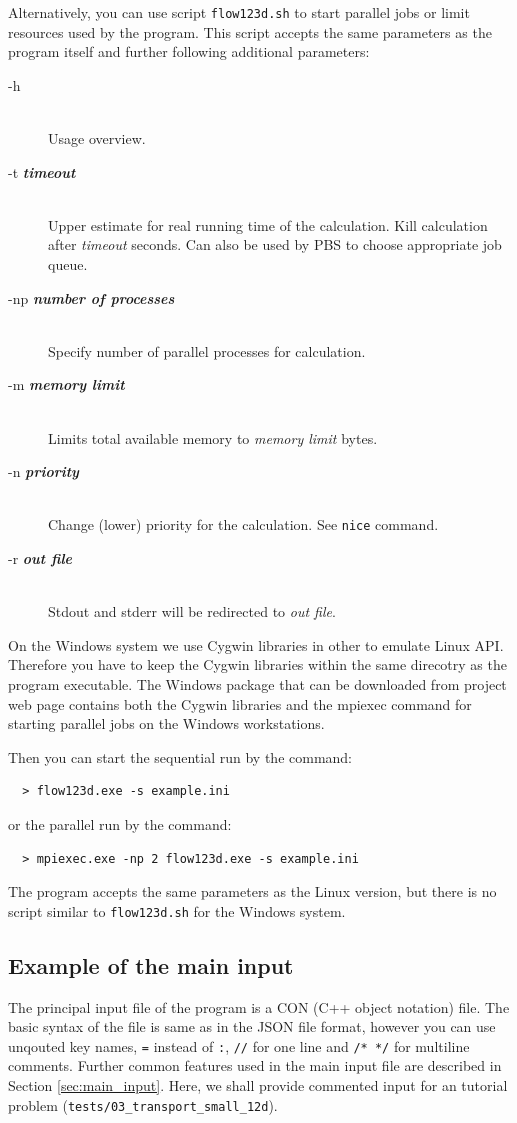 \documentclass[12pt,a4paper]{report}
\begin{document}
Alternatively, you can use script \verb'flow123d.sh' to start parallel jobs or limit resources used by the program. 
This script accepts the same parameters as the program itself
and further following additional parameters:

\begin{description}
  \item[-h] \hfill\\
  	Usage overview.
  \item[-t {\bf\it timeout}] \hfill\\
  	Upper estimate for real running time of the calculation. Kill calculation after {\it timeout} seconds. 
  	Can also be used by PBS to choose appropriate job queue. 
  \item[-np {\bf\it number of processes}] \hfill\\
  	Specify number of parallel processes for calculation.
  \item[-m {\bf\it memory limit}] \hfill\\
  	Limits total available memory to {\it memory limit} bytes.
  \item[-n {\bf\it priority}] \hfill\\
  	Change (lower) priority for the calculation. See {\tt nice} command.
  \item[-r {\bf\it out file}] \hfill\\
  	Stdout and stderr will be redirected to {\it out file}.
\end{description}

On the Windows system we use Cygwin libraries in other to emulate Linux API.
Therefore you have to keep the Cygwin libraries within the same direcotry as the program executable.
The Windows package that can be downloaded from project web page contains both the Cygwin libraries
and the mpiexec command for starting parallel jobs on the Windows workstations.

Then you can start the sequential run by the command:
\begin{verbatim}
  > flow123d.exe -s example.ini
\end{verbatim}
or the parallel run by the command:
\begin{verbatim}
  > mpiexec.exe -np 2 flow123d.exe -s example.ini
\end{verbatim}
The program accepts the same parameters as the Linux version, but there is no script similar to \verb'flow123d.sh' for the Windows system.


\subsection{Example of the main input}
The principal input file of the program is a CON (C++ object notation) file. The basic syntax of the file is same as in the JSON file format,
however you can use unqouted key names, \verb'=' instead of \verb':', \verb'//' for one line and \verb'/* */' for multiline comments.
Further common features used in the main input file are described in Section \ref{sec:main_input}. Here, we shall 
provide commented input for an tutorial problem (\verb'tests/03_transport_small_12d').
\end{document}
